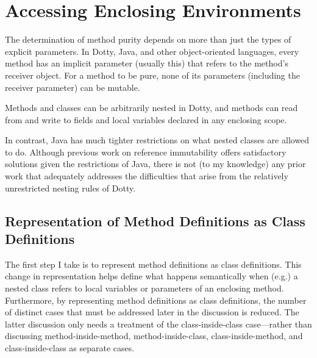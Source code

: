 \section{Accessing Enclosing Environments}

The determination of method purity depends on more than just the types of explicit parameters. In Dotty, Java, and other object-oriented languages, every method has an implicit parameter (usually {\cd this}) that refers to the method's receiver object. For a method to be pure, none of its parameters (including the receiver parameter) can be mutable.

Methods and classes can be arbitrarily nested in Dotty, and methods can read from and write to fields and local variables declared in any enclosing scope.

In contrast, Java has much tighter restrictions on what nested classes are allowed to do. Although previous work on reference immutability offers satisfactory solutions given the restrictions of Java, there is not (to my knowledge) any prior work that adequately addresses the difficulties that arise from the relatively unrestricted nesting rules of Dotty.



\begin{comment}
2. traits have uniquely-named outer-reference fields.
3. methods are defined as classes (logic goes in the constructor, locals become fields,)
4. calls to methods become pairs of construct / field read.
5. the `this' read becomes a read of an outer field
6. construction of classes involves passing the outer reference as a param
Order of transformation: Innermost methods first?
\end{comment}

\subsection{Representation of Method Definitions as Class Definitions} \label{sec:methdefs-as-classdefs}

The first step I take is to represent method definitions as class definitions. This change in representation helps define what happens semantically when (e.g.) a nested class refers to local variables or parameters of an enclosing method. Furthermore, by representing method definitions as class definitions, the number of distinct cases that must be addressed later in the discussion is reduced. The latter discussion only needs a treatment of the class-inside-class case---rather than discussing method-inside-method, method-inside-class, class-inside-method, and class-inside-class as separate cases.


